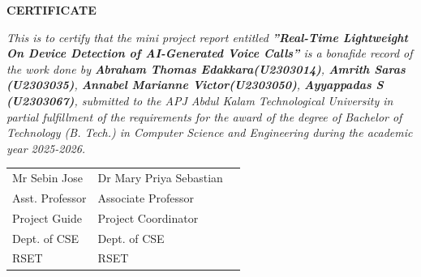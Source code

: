 \documentclass[12pt,a4paper,titlepage]{report}
\begin{document}
	\newpage
	\thispagestyle{empty}
	\begin{center}
	
		\large \bfseries{\huge{CERTIFICATE}}\\[5cm]
	\end{center}
	
	\renewcommand{\baselinestretch}{1.2}\normalsize
	
	\emph{This is to certify that the mini project report entitled \textbf{”Real-Time Lightweight On Device Detection of AI-Generated Voice Calls”} is a bonafide record of the work done by \textbf{Abraham Thomas Edakkara(U2303014)}, \textbf{Amrith Saras  (U2303035)}, \textbf{Annabel Marianne Victor(U2303050)}, \textbf{Ayyappadas S (U2303067)}, submitted to the APJ Abdul Kalam Technological University in partial fulfillment of the requirements for the award of the degree of Bachelor of Technology (B. Tech.) in Computer Science and Engineering during the academic year 2025-2026.}\\[2.5cm]
	
\begin{flushleft}
	
	
	\begin{longtable}{p{10.3cm} p{8cm} p{5.25cm}}
		{Mr Sebin Jose}& {Dr Mary Priya Sebastian}\\
		{Asst. Professor}& {Associate Professor}\\
        {Project Guide}& {Project Coordinator}\\
		{Dept. of CSE}&  {Dept. of CSE}\\
		{RSET} ~&{RSET} \\
		
	\end{longtable}
\end{flushleft}
	
\end{document}
